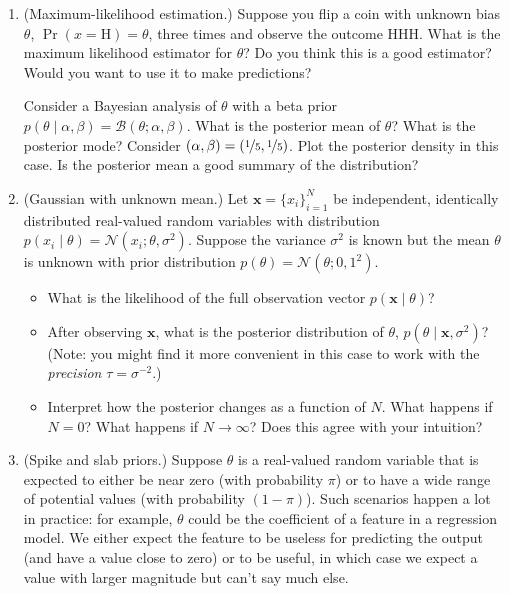 \documentclass{article}
\newcommand{\given}{\mid}
\newcommand{\mc}[1]{\mathcal{#1}}
\begin{document}
\begin{enumerate}
\item
  (Maximum-likelihood estimation.)
  Suppose you flip a coin with unknown bias $\theta$, $\Pr(x =
  \text{H}) = \theta$, three times and observe the outcome HHH.  What
  is the maximum likelihood estimator for $\theta$?  Do you think this
  is a good estimator?  Would you want to use it to make predictions?

  Consider a Bayesian analysis of $\theta$ with a beta prior $p(\theta
  \given \alpha, \beta) = \mc{B}(\theta; \alpha, \beta)$.  What is the
  posterior mean of $\theta$?  What is the posterior mode?  Consider
  $(\alpha, \beta) = (\nicefrac{1}{5}, \nicefrac{1}{5})$.  Plot the
  posterior density in this case.  Is the posterior mean a good
  summary of the distribution?

\item
  (Gaussian with unknown mean.)
  Let $\bm{x} = \{ x_i \}_{i = 1}^N$ be independent, identically
  distributed real-valued random variables with distribution $p(x_i
  \given \theta) = \mc{N}(x_i; \theta, \sigma^2)$.  Suppose the
  variance $\sigma^2$ is known but the mean $\theta$ is unknown with
  prior distribution $p(\theta) = \mc{N}(\theta; 0, 1^2)$.
  \begin{itemize}
  \item
    What is the likelihood of the full observation vector $p(\bm{x}
    \given \theta)$?
  \item
    After observing $\bm{x}$, what is the posterior distribution of
    $\theta$, $p(\theta \given \bm{x}, \sigma^2)$?  (Note: you might
    find it more convenient in this case to work with the
    \emph{precision} $\tau = \sigma^{-2}$.)
  \item
    Interpret how the posterior changes as a function of $N$.  What
    happens if $N = 0$?  What happens if $N \to \infty$?  Does this
    agree with your intuition?
  \end{itemize}

\item
  (Spike and slab priors.)
  Suppose $\theta$ is a real-valued random variable that is expected
  to either be near zero (with probability $\pi$) or to have a wide
  range of potential values (with probability $(1 - \pi)$).  Such
  scenarios happen a lot in practice: for example, $\theta$ could be
  the coefficient of a feature in a regression model.  We either
  expect the feature to be useless for predicting the output (and have
  a value close to zero) or to be useful, in which case we expect a
  value with larger magnitude but can't say much else.


\end{enumerate}
\end{document}
